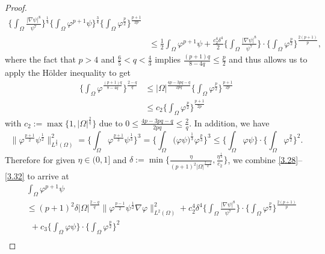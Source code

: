 \documentclass[12pt]{article}
\theoremstyle{plain}
\theoremstyle{definition}
\numberwithin{equation}{section}
\begin{document}
\begin{proof}
\begin{align}
             \bigg\{\int_\Omega\frac{|\nabla\psi|^8}{\psi^7}\bigg\}^{\frac{1}{4}}\bigg\{\int_\Omega\varphi^{p+1}\psi\bigg\}^{\frac{3} {4}}\bigg\{\int_\Omega\varphi^{\frac{p}{2}}\bigg\}^{\frac{p+1} {2p}}\nonumber\\%
             &\leq\frac{1}{2}\int_\Omega\varphi^{p+1}\psi+\frac{c_2^4\delta^4}{2}\bigg\{\int_\Omega\frac{|\nabla\psi|^8}{\psi^7}\bigg\}\cdot\bigg\{\int_\Omega\varphi^{\frac{p}{2}}\bigg\}^{\frac{2(p+1)} {p}},\nonumber
        \end{align}
where the fact that $p>4$ and $\frac6 5 <q<\frac4 3$ implies $\frac{(p+1)q}{8-4q}\leq\frac{p}{2}$ and thus allows us to apply the H\"{o}lder inequality to get
\begin{align*}
\bigg\{\int_\Omega\varphi^{\frac{(p+1)q}{8-4q}}\bigg\}^{\frac{2-q} {q}}
&\leq|\Omega|^{\frac{4p-3pq-q}{2pq}}
\bigg\{\int_\Omega\varphi^{\frac{p}{2}}\bigg\}^{\frac{p+1} {2p}}\\
& \leq c_2\bigg\{\int_\Omega\varphi^{\frac{p}{2}}\bigg\}^{\frac{p+1} {2p}}
\end{align*}
with $c_2:=\max\{1,|\Omega|^{\frac{2}{q}}\}$ due to $0\leq\frac{4p-3pq-q}{2pq}\leq\frac{2}{q}$.
    In addition, we have
    \begin{equation}\label{3.32}
        \|\varphi^{\frac{p+1}{2}}\psi^{\frac{1}{2}}\|_{L^{\frac{2}{3}}(\Omega)}^2=\bigg\{\int_\Omega\varphi^{\frac{p+1}{3}}\psi^{\frac{1}{3}}\bigg\}^{3}=\bigg\{\int_\Omega\big(\varphi\psi\big)^{\frac{1}{3}}\varphi^{\frac{p}{3}}\bigg\}^{3}\leq\bigg\{\int_\Omega\varphi\psi\bigg\}\cdot\bigg\{\int_\Omega\varphi^{\frac{p}{2}}\bigg\}^{2}.
    \end{equation}
    Therefore  for given $\eta\in(0,1]$ and $\delta:=\min\big\{\frac{\eta}{(p+1)^2|\Omega|^{\frac{2-q}{q}}},\frac{\eta^{\frac{1}{4}}}{c_2}\big\}$, we combine \eqref{3.28}--\eqref{3.32} to arrive at
    \begin{align}\label{3.33}
            &\int_\Omega\varphi^{p+1}\psi\nonumber\\
            ~~&\leq(p+1)^2 \delta|\Omega|^{\frac{2-q}{q}}\|\varphi^{\frac{p-1}{2}}\psi^{\frac1 2}\nabla\varphi\|_{L^2(\Omega)}^2+c_2^4\delta^4\bigg\{\int_\Omega\frac{|\nabla\psi|^8}{\psi^7}\bigg\}\cdot\bigg\{\int_\Omega\varphi^{\frac{p}{2}}\bigg\}^{\frac{2(p+1)} {p}}\nonumber\\
            &~~+c_3%
            \bigg\{\int_\Omega\varphi\psi\bigg\}
            \cdot\bigg\{\int_\Omega\varphi^{\frac{p}{2}}\bigg\}^{2}\\

\end{align}
\end{proof}
\end{document}

